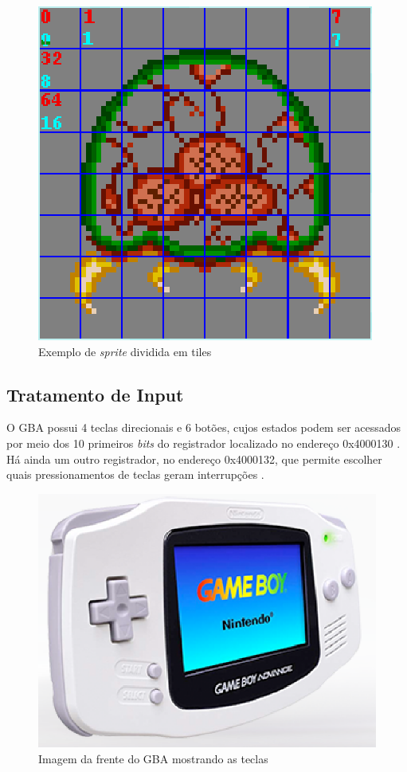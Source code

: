 \begin{figure}[H]
 \centering \includegraphics[keepaspectratio=true,scale=0.6]{figuras/metroid-sprite.eps}
   \caption{Exemplo de \textit{sprite} dividida em tiles}
   \label{metroid-sprite}
\end{figure}

\subsection{Tratamento de Input}

O GBA possui 4 teclas direcionais e 6 botões, cujos estados podem ser acessados por meio dos 10 primeiros \textit{bits} do registrador localizado no endereço 0x4000130 \cite{gbatek}. Há ainda um outro registrador, no endereço 0x4000132, que permite escolher quais pressionamentos de teclas geram interrupções \cite{cowbite}.

\begin{figure}[H]
 \centering \includegraphics[keepaspectratio=true,scale=0.6]{figuras/gba-frente.eps}
   \caption{Imagem da frente do GBA mostrando as teclas}
   \label{gba-frente}
\end{figure}

